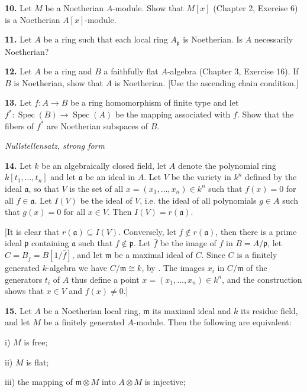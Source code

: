 \medskip
\noindent\textbf{10.} Let $M$ be a Noetherian $A$-module.  Show that $M[x]$ (Chapter 2, Exercise 6) is a
Noetherian $A[x]$-module.

\medskip
\noindent\textbf{11.} Let $A$ be a ring such that each local ring $A_\mathfrak p$ is Noetherian.  Is $A$ necessarily
Noetherian?

\medskip
\noindent\textbf{12.} Let $A$ be a ring and $B$ a faithfully flat $A$-algebra (Chapter 3, Exercise 16).  If $B$
is Noetherian, show that $A$ is Noetherian.  [Use the ascending chain condition.]

\medskip
\noindent\textbf{13.} Let $f:A\longrightarrow B$ be a ring homomorphism of finite type and let $f^*:\operatorname{Spec}(B)\longrightarrow
\operatorname{Spec}(A)$ be the mapping associated with $f$.  Show that the fibers of $f^*$ are
Noetherian subspaces of $B$.

\medskip
\noindent\emph{Nullstellensatz, strong form}

\medskip
\noindent\textbf{14.} Let $k$ be an algebraically closed field, let $A$ denote the polynomial ring
$k[t_1,\ldots,t_n]$ and let $\mathfrak a$ be an ideal in $A$.  Let $V$ be the variety in $k^n$ defined by the
ideal $\mathfrak a$, so that $V$ is the set of all $x=(x_1,\ldots,x_n)\in k^n$ such that $f(x)=0$ for all
$f\in\mathfrak a$.  Let $I(V)$ be the ideal of $V$, i.e. the ideal of all polynomials $g\in A$ such that
$g(x)=0$ for all $x\in V$.  Then $I(V)=r(\mathfrak a)$.

[It is clear that $r(\mathfrak a)\subseteq I(V)$.  Conversely, let $f\notin r(\mathfrak a)$, then there is a prime ideal $\mathfrak p$
containing $\mathfrak a$ such that $f\notin\mathfrak p$.  Let $\bar f$ be the image of $f$ in $B=A/\mathfrak p$, let $C=B_{\bar f}=
B[1/\bar f]$, and let $\mathfrak m$ be a maximal ideal of $C$.  Since $C$ is a finitely generated $k$-algebra we have $C/\mathfrak m\cong k$, by .  The images $x_i$ in $C/\mathfrak m$ of the generators $t_i$
of $A$ thus define a point $x=(x_1,\ldots,x_n)\in k^n$, and the construction shows that
$x\in V$ and $f(x)\ne0$.]

\medskip
\noindent\amstar\textbf{15.} Let $A$ be a Noetherian local ring, $\mathfrak m$ its maximal ideal and $k$ its residue field, and
let $M$ be a finitely generated $A$-module.  Then the following are equivalent:

i) $M$ is free;

ii) $M$ is flat;

iii) the mapping of $\mathfrak m\otimes M$ into $A\otimes M$ is injective;

